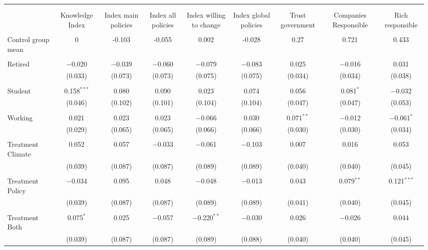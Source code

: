 
\begin{tabular}{@{\extracolsep{5pt}}lcccccccc} 
\\[-1.8ex]\hline 
\hline \\[-1.8ex] 
\\[-1.8ex] & Knowledge Index & Index main policies & Index all policies & Index willing to change & Index global policies & Trust government & Companies Responsible & Rich responsible \\ 
\hline \\[-1.8ex] 
 Control group mean & 0 & -0.103 & -0.055 & 0.002 & -0.028 & 0.27 & 0.721 & 0.433  \\ \hline \\[-1.8ex] Retired & $-$0.020 & $-$0.039 & $-$0.060 & $-$0.079 & $-$0.083 & 0.025 & $-$0.016 & 0.031 \\ 
  & (0.033) & (0.073) & (0.073) & (0.075) & (0.075) & (0.034) & (0.034) & (0.038) \\ 
  & & & & & & & & \\ 
 Student & 0.158$^{***}$ & 0.080 & 0.090 & 0.023 & 0.074 & 0.056 & 0.081$^{*}$ & $-$0.032 \\ 
  & (0.046) & (0.102) & (0.101) & (0.104) & (0.104) & (0.047) & (0.047) & (0.053) \\ 
  & & & & & & & & \\ 
 Working & 0.021 & 0.023 & 0.023 & $-$0.066 & 0.030 & 0.071$^{**}$ & $-$0.012 & $-$0.061$^{*}$ \\ 
  & (0.029) & (0.065) & (0.065) & (0.066) & (0.066) & (0.030) & (0.030) & (0.034) \\ 
  & & & & & & & & \\ 
 Treatment Climate & 0.052 & 0.057 & $-$0.033 & $-$0.061 & $-$0.103 & 0.007 & 0.016 & 0.053 \\ 
  & (0.039) & (0.087) & (0.087) & (0.089) & (0.089) & (0.040) & (0.040) & (0.045) \\ 
  & & & & & & & & \\ 
 Treatment Policy & $-$0.034 & 0.095 & 0.048 & $-$0.048 & $-$0.013 & 0.043 & 0.079$^{**}$ & 0.121$^{***}$ \\ 
  & (0.039) & (0.087) & (0.087) & (0.089) & (0.089) & (0.041) & (0.040) & (0.045) \\ 
  & & & & & & & & \\ 
 Treatment Both & 0.075$^{*}$ & 0.025 & $-$0.057 & $-$0.220$^{**}$ & $-$0.030 & 0.026 & $-$0.026 & 0.044 \\ 
  & (0.039) & (0.087) & (0.087) & (0.089) & (0.088) & (0.040) & (0.040) & (0.045) \\ 

\end{tabular}
